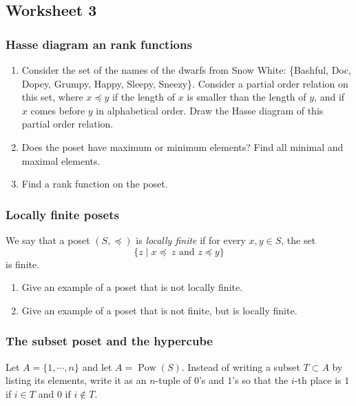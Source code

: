 \documentclass{amsart}
\begin{document}
\subsection{Worksheet 3}
\label{sec:orgcca6411}
\togglefalse{solutions}
\subsubsection{Hasse diagram an rank functions}
\label{sec:org6497906}

\begin{enumerate}
\item Consider the set of the names of the dwarfs from Snow White: \{Bashful, Doc, Dopey, Grumpy, Happy, Sleepy, Sneezy\}.
Consider a partial order relation on this set, where \(x \preceq y\) if the length of \(x\) is smaller than the length of \(y\), and if \(x\) comes before \(y\) in alphabetical order.
Draw the Hasse diagram of this partial order relation.

\item Does the poset have maximum or minimum elements?
Find all minimal and maximal elements.

\item Find a rank function on the poset.
\end{enumerate}
\subsubsection{Locally finite posets}
\label{sec:orgf247e88}

We say that a poset \((S, \preceq)\) is \emph{locally finite} if for every \(x,y \in S\), the set \[\{z \mid x \preceq\ z \text{ and } z \preceq y\} \]
   is finite.

\begin{enumerate}
\item Give an example of a poset that is not locally finite.

\item Give an example of a poset that is not finite, but is locally finite.
\end{enumerate}
\subsubsection{The subset poset and the hypercube}
\label{sec:org6173e77}
Let \(A = \{1,\cdots, n\}\) and let \(A = \operatorname{Pow}(S)\).
Instead of writing a subset \(T \subset A\) by listing its elements, write it as an \(n\)-tuple of \(0\)'s and \(1\)'s so that the \(i\)-th place is \(1\) if \(i \in T\) and \(0\) if \(i \not \in T\).
\end{document}

